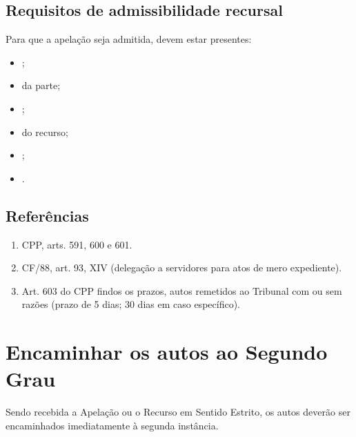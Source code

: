 \documentclass[letterpaper,10pt,brazil]{sphinxmanual}
\begin{document}
\subsection{Requisitos de admissibilidade recursal}
\label{\detokenize{11decisao_recebimento_apelacao:requisitos-de-admissibilidade-recursal}}
\sphinxAtStartPar
Para que a apelação seja admitida, devem estar presentes:
\begin{itemize}
\item {} 
\sphinxAtStartPar
{};

\item {} 
\sphinxAtStartPar
{} da parte;

\item {} 
\sphinxAtStartPar
{};

\item {} 
\sphinxAtStartPar
{} do recurso;

\item {} 
\sphinxAtStartPar
{};

\item {} 
\sphinxAtStartPar
{}.

\end{itemize}


\subsection{Referências}
\label{\detokenize{11decisao_recebimento_apelacao:referencias}}\begin{enumerate}
%
\item {} 
\sphinxAtStartPar
CPP, arts. 591, 600 e 601.

\item {} 
\sphinxAtStartPar
CF/88, art. 93, XIV (delegação a servidores para atos de mero expediente).

\item {} 
\sphinxAtStartPar
Art. 603 do CPP \textendash{} findos os prazos, autos remetidos ao Tribunal com ou sem razões (prazo de 5 dias; 30 dias em caso específico).

\end{enumerate}

\sphinxstepscope


\section{Encaminhar os autos ao Segundo Grau}
\label{\detokenize{12encaminhar_segundo_grau:encaminhar-os-autos-ao-segundo-grau}}\label{\detokenize{12encaminhar_segundo_grau::doc}}
\sphinxAtStartPar
Sendo recebida a Apelação ou o Recurso em Sentido Estrito, os autos deverão ser encaminhados imediatamente à segunda instância.
\end{document}
